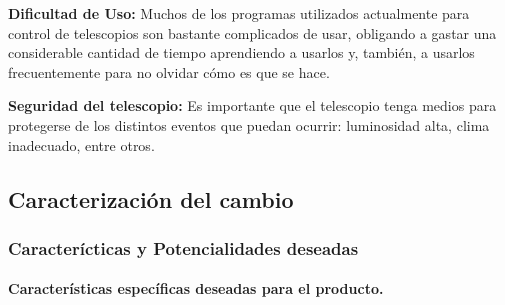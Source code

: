 \documentclass[letterpaper,titlepage,spanish,10pt]{article}
\begin{document}
\textbf{Dificultad de Uso:} Muchos de los programas utilizados actualmente para control 
de telescopios son bastante complicados de usar, obligando a gastar una considerable 
cantidad de tiempo aprendiendo a usarlos y, tambi\'en, a usarlos frecuentemente para no 
olvidar c\'omo es que se hace.

\textbf{Seguridad del telescopio:} Es importante que el telescopio tenga medios para 
protegerse de los distintos eventos que puedan ocurrir: luminosidad alta, clima inadecuado, 
entre otros. 

\newpage

\subsection{Caracterizaci\'on del cambio}
\subsubsection{Caracter\'icticas y Potencialidades deseadas}


\paragraph{Caracter\'isticas espec\'ificas deseadas para el producto.}
\end{document}

